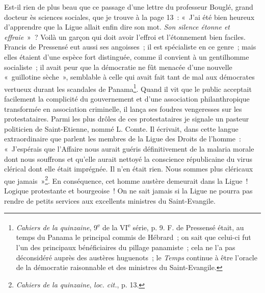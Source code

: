 \documentclass[french,twoside]{book} %
\begin{document}
Est-il rien de plus beau que ce passage d’une lettre du professeur Bouglé, grand docteur ès sciences sociales, que je trouve à la page 13 : « J’ai été bien heureux d’apprendre que la Ligue allait enfin dire son mot. \emph{Son silence étonne et effraie} » ? Voilà un garçon qui doit avoir l’effroi et l’étonnement bien faciles. Francis de Pressensé eut aussi ses angoisses ; il est spécialiste en ce genre ;  mais elles étaient d’une espèce fort distinguée, comme il convient à un gentilhomme socialiste ; il avait peur que la démocratie ne fût menacée d’une nouvelle « guillotine sèche », semblable à celle qui avait fait tant de mal aux démocrates vertueux durant les scandales de Panama\footnote{ \noindent \emph{Cahiers de la quinzaine}, 9\textsuperscript{e} de la VI\textsuperscript{e} série, p. 9. F. de Pressensé était, au temps du Panama le principal commis de Hébrard ; on sait que celui-ci fut l’un des principaux bénéficiaires du pillage panamiste ; cela ne l’a pas déconsidéré auprès des austères huguenots ; le \emph{Temps} continue à être l’oracle de la démocratie raisonnable et des ministres du Saint-Evangile.
 }. Quand il vit que le public acceptait facilement la complicité du gouvernement et d’une association philanthropique transformée en association criminelle, il lança ses foudres vengeresses sur les protestataires. Parmi les plus drôles de ces protestataires je signale un pasteur politicien de Saint-Etienne, nommé L. Comte. Il écrivait, dans cette langue extraordinaire que parlent les membres de la Ligue des Droits de l’homme : « J’espérais que l’Affaire nous aurait guéris définitivement de la malaria morale dont nous souffrons et qu’elle aurait nettoyé la conscience républicaine du virus clérical dont elle était imprégnée. Il n’en était rien. Nous sommes plus cléricaux que jamais »\footnote{ \noindent \emph{Cahiers de la quinzaine}, \emph{loc. cit.}, p. 13.
 }. En conséquence, cet homme austère demeurait dans la Ligue ! Logique protestante et bourgeoise ! On ne sait jamais si la Ligue ne pourra pas rendre de petits services aux excellents ministres du Saint-Evangile.\par
\end{document}
